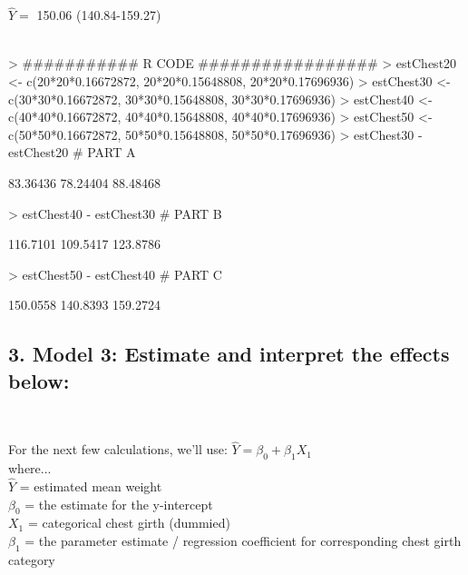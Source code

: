 \documentclass{article}
\begin{document}
\noindent $\hat{Y}=$ 150.06 (140.84-159.27) \\

\\


\begin{Schunk}
\begin{Sinput}
> ########### R CODE #################
> estChest20 <- c(20*20*0.16672872, 20*20*0.15648808, 20*20*0.17696936)
> estChest30 <-  c(30*30*0.16672872, 30*30*0.15648808, 30*30*0.17696936)
> estChest40 <-  c(40*40*0.16672872, 40*40*0.15648808, 40*40*0.17696936)
> estChest50 <-  c(50*50*0.16672872, 50*50*0.15648808, 50*50*0.17696936)
> estChest30 - estChest20 # PART A
\end{Sinput}
\begin{Soutput}
[1] 83.36436 78.24404 88.48468
\end{Soutput}
\begin{Sinput}
> estChest40 - estChest30 # PART B
\end{Sinput}
\begin{Soutput}
[1] 116.7101 109.5417 123.8786
\end{Soutput}
\begin{Sinput}
> estChest50 - estChest40 # PART C
\end{Sinput}
\begin{Soutput}
[1] 150.0558 140.8393 159.2724
\end{Soutput}
\end{Schunk}

\newpage
\subsection*{3. Model 3: Estimate and interpret the effects below:} \\


For the next few calculations, we'll use: $\hat{Y}=\beta_0+\beta_1 X_1$ \\
where... \\
$\hat{Y}$ = estimated mean weight \\
$\beta_0$ = the estimate for the y-intercept \\
$X_1$ = categorical chest girth (dummied) \\
$\beta_1$ = the parameter estimate / regression coefficient for corresponding chest girth category\\
\end{document}
